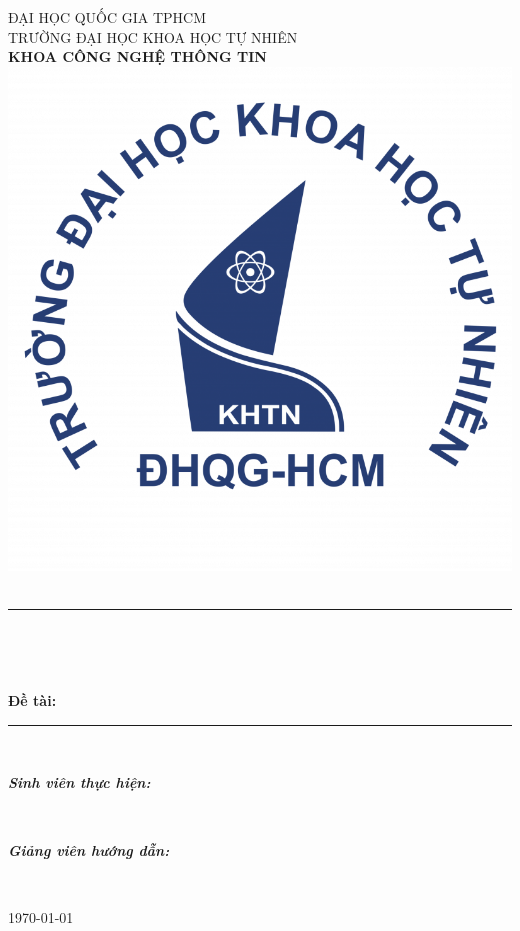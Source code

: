 \begin{titlepage}
\newcommand{\HRule}{\rule{\linewidth}{0.5mm}}
\centering

\vspace*{-40pt}
\large ĐẠI HỌC QUỐC GIA TPHCM\\
\large TRƯỜNG ĐẠI HỌC KHOA HỌC TỰ NHIÊN\\
\large \textbf{KHOA CÔNG NGHỆ THÔNG TIN}\\[0.45cm]
\includegraphics[width=0.33\linewidth]{img/hcmus-logo.png}\\[-0.30cm]

\textbf{\Large \coursename}\\[0.15cm]

\HRule \\[0.00cm]
{ 
\LARGE{\bfseries{\reporttitle}}\\[0.15cm]
\raggedright\large{\bfseries{Đề tài:}}\\[0.2cm]
  {\centering
    \begin{spacing}{1.08}
    \LARGE{\bfseries{\reportname}}
    \end{spacing}
  }
}
\HRule \\[0.3cm]

\begin{minipage}[t]{0.4\textwidth}
\begin{flushleft} \large
\emph{\textbf{Sinh viên thực hiện:}}\\
\studentname
\end{flushleft}
\end{minipage}
~
\begin{minipage}[t]{0.4\textwidth}
\begin{flushright} \large
\emph{\textbf{Giảng viên hướng dẫn:}} \\
\teachername
\end{flushright}
\end{minipage}\\[1cm]


\vfill
{\large \today}\\[0.8cm]

\end{titlepage}
